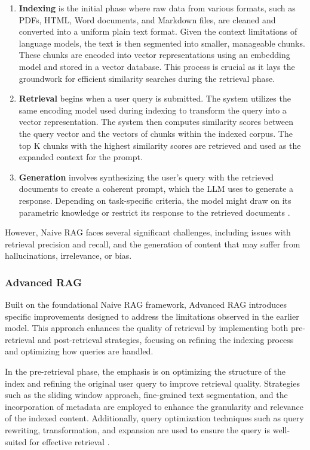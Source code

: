 \begin{enumerate}
    \item \textbf{Indexing} is the initial phase where raw data from various formats, such as PDFs, HTML, Word documents, and Markdown files, are cleaned and converted into a uniform plain text format. Given the context limitations of language models, the text is then segmented into smaller, manageable chunks. These chunks are encoded into vector representations using an embedding model and stored in a vector database. This process is crucial as it lays the groundwork for efficient similarity searches during the retrieval phase.
    \item \textbf{Retrieval} begins when a user query is submitted. The system utilizes the same encoding model used during indexing to transform the query into a vector representation. The system then computes similarity scores between the query vector and the vectors of chunks within the indexed corpus. The top K chunks with the highest similarity scores are retrieved and used as the expanded context for the prompt.
    \item \textbf{Generation} involves synthesizing the user’s query with the retrieved documents to create a coherent prompt, which the LLM uses to generate a response. Depending on task-specific criteria, the model might draw on its parametric knowledge or restrict its response to the retrieved documents \cite{gao2023retrieval}.
\end{enumerate}

However, Naive RAG faces several significant challenges, including issues with retrieval precision and recall, and the generation of content that may suffer from hallucinations, irrelevance, or bias.

\subsubsection{Advanced RAG}

Built on the foundational Naive RAG framework, Advanced RAG introduces specific improvements designed to address the limitations observed in the earlier model. This approach enhances the quality of retrieval by implementing both pre-retrieval and post-retrieval strategies, focusing on refining the indexing process and optimizing how queries are handled.

In the pre-retrieval phase, the emphasis is on optimizing the structure of the index and refining the original user query to improve retrieval quality. Strategies such as the sliding window approach, fine-grained text segmentation, and the incorporation of metadata are employed to enhance the granularity and relevance of the indexed content. Additionally, query optimization techniques such as query rewriting, transformation, and expansion are used to ensure the query is well-suited for effective retrieval \cite{ilin2023advancedrag}.


